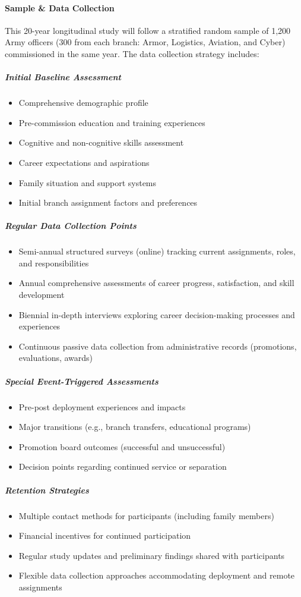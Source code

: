 \documentclass[../main.tex]{subfiles}
\begin{document}
\paragraph{Sample \& Data Collection}

This 20-year longitudinal study will follow a stratified random sample of 1,200 Army officers (300 from each branch: Armor, Logistics, Aviation, and Cyber) commissioned in the same year. The data collection strategy includes:

\subparagraph{Initial Baseline Assessment}
\begin{itemize}
\item Comprehensive demographic profile
\item Pre-commission education and training experiences
\item Cognitive and non-cognitive skills assessment
\item Career expectations and aspirations
\item Family situation and support systems
\item Initial branch assignment factors and preferences
\end{itemize}

\subparagraph{Regular Data Collection Points}
\begin{itemize}
\item Semi-annual structured surveys (online) tracking current assignments, roles, and responsibilities
\item Annual comprehensive assessments of career progress, satisfaction, and skill development
\item Biennial in-depth interviews exploring career decision-making processes and experiences
\item Continuous passive data collection from administrative records (promotions, evaluations, awards)
\end{itemize}

\subparagraph{Special Event-Triggered Assessments}
\begin{itemize}
\item Pre-post deployment experiences and impacts
\item Major transitions (e.g., branch transfers, educational programs)
\item Promotion board outcomes (successful and unsuccessful)
\item Decision points regarding continued service or separation
\end{itemize}

\subparagraph{Retention Strategies}
\begin{itemize}
\item Multiple contact methods for participants (including family members)
\item Financial incentives for continued participation
\item Regular study updates and preliminary findings shared with participants
\item Flexible data collection approaches accommodating deployment and remote assignments
\end{itemize}
\end{document}
